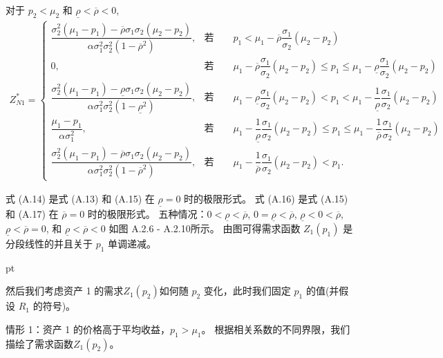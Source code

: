 \documentclass[10.0pt]{article}
\begin{document}
对于 $ p_2 < \mu_2 $ 和 $ \underline{\rho} < \overline{\rho} < 0 $,
{\footnotesize \begin{eqnarray}
Z_{N 1}^* = \left\{ \begin{matrix}
\dfrac{\sigma_2^2 (\mu_1 - p_1) - \overline{\rho} \sigma_1 \sigma_2 (\mu_2 - p_2)}{\alpha \sigma_1^2 \sigma_2^2 (1 - \overline{\rho}^2)}, & \text{若} \qquad p_1 < \mu_1 - \overline{\rho} \dfrac{\sigma_1}{\sigma_2} (\mu_2 - p_2) \\
0, & \text{若} \qquad \mu_1 - \overline{\rho} \dfrac{\sigma_1}{\sigma_2} (\mu_2 - p_2) \leqslant p_1 \leqslant \mu_1 - \underline{\rho} \dfrac{\sigma_1}{\sigma_2} (\mu_2 - p_2) \\
\dfrac{\sigma_2^2 (\mu_1 - p_1) - \underline{\rho} \sigma_1 \sigma_2 (\mu_2 - p_2)}{\alpha \sigma_1^2 \sigma_2^2 (1 - \underline{\rho}^2)}, & \text{若} \qquad \mu_1 - \underline{\rho} \dfrac{\sigma_1}{\sigma_2} (\mu_2 - p_2) < p_1 < \mu_1 - \dfrac1{\underline{\rho}} \dfrac{\sigma_1}{\sigma_2} (\mu_2 - p_2) \\
\dfrac{\mu_1 - p_1}{\alpha \sigma_1^2}, & \text{若} \qquad \mu_1 - \dfrac1{\underline{\rho}} \dfrac{\sigma_1}{\sigma_2} (\mu_2 - p_2) \leqslant p_1 \leqslant \mu_1 - \dfrac1{\overline{\rho}} \dfrac{\sigma_1}{\sigma_2} (\mu_2 - p_2) \\
\dfrac{\sigma_2^2 (\mu_1 - p_1) - \overline{\rho} \sigma_1 \sigma_2 (\mu_2 - p_2)}{\alpha \sigma_1^2 \sigma_2^2 (1 - \overline{\rho}^2)}, & \text{若} \qquad \mu_1 - \dfrac1{\overline{\rho}} \dfrac{\sigma_1}{\sigma_2} (\mu_2 - p_2) < p_1.
\end{matrix} \right.
\end{eqnarray}}



式 (A.14) 是式 (A.13) 和 (A.15) 在 $ \underline{\rho} = 0 $ 时的极限形式。
式 (A.16) 是式 (A.15) 和 (A.17) 在 $ \overline{\rho} = 0 $ 时的极限形式。
五种情况：$0 < \underline{\rho} < \overline{\rho} $, $ 0 = \underline{\rho} < \overline{\rho} $, $ \underline{\rho} < 0 < \overline{\rho} $, $ \underline{\rho} < \overline{\rho} = 0 $, 和 $ \underline{\rho} < \overline{\rho} < 0 $ 如图 A.2.6 - A.2.10所示。 由图可得需求函数 $ Z_1 (p_1) $ 是分段线性的并且关于 $ p_1 $ 单调递减。

 pt


然后我们考虑资产 1 的需求$ Z_1 (p_2) $如何随 $ p_2 $ 变化，此时我们固定 $ p_1 $ 的值(并假设 $ R_1 $ 的符号)。

情形 1：资产 1 的价格高于平均收益，$ p_1 > \mu_1 $。 根据相关系数的不同界限，我们描绘了需求函数$Z_1 (p_2)$。
\end{document}
